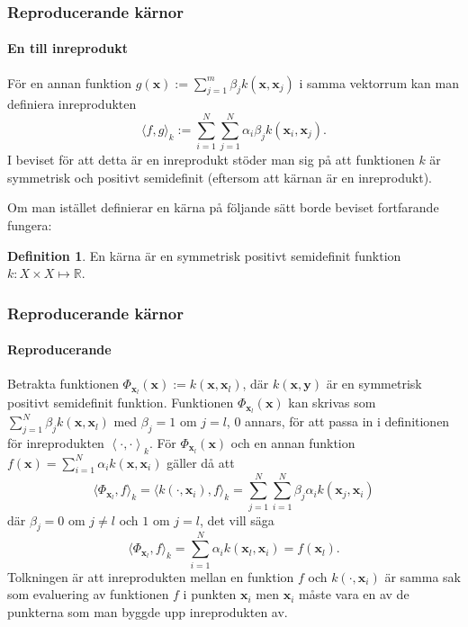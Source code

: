 \documentclass{beamer}
\theoremstyle{definition}
\newtheorem{defi}{Definition}[section]
\theoremstyle{remark}
\newcommand{\bfx}{\mathbf{x}}
\newcommand{\bfy}{\mathbf{y}}
\newcommand{\llangle}{\left\langle}
\newcommand{\rrangle}{\right\rangle}
\newcommand{\inner}[2]{\llangle #1, #2 \rrangle}
\begin{document}
\begin{frame}
\frametitle{Reproducerande kärnor}
\framesubtitle{En till inreprodukt}
För en annan funktion $g\left(\bfx\right):=\sum_{j=1}^{m}\beta_jk\left(\bfx, \bfx_j\right)$ i samma vektorrum kan man definiera inreprodukten
\begin{equation*}\label{eq:polykärnaprodukt}
\langle f , g\rangle_k := \sum_{i=1}^{N}\sum_{j=1}^{N} \alpha_i \beta_j k\left(\bfx_i, \bfx_j\right).
\end{equation*}
I beviset för att detta är en inreprodukt stöder man sig på att funktionen $k$ är symmetrisk och positivt semidefinit (eftersom att kärnan är en inreprodukt).

Om man istället definierar en kärna på följande sätt borde beviset fortfarande fungera:
\begin{defi}
	En kärna är en symmetrisk positivt semidefinit funktion $k: X \times X \longmapsto \mathbb{R}$.
\end{defi}
\end{frame}

\begin{frame}
\frametitle{Reproducerande kärnor}
\framesubtitle{Reproducerande}
Betrakta funktionen $\Phi_{\bfx_l}(\bfx):=k\left(\bfx, \bfx_l\right)$, där $k\left(\bfx, \bfy\right)$ är en symmetrisk positivt semidefinit funktion.  Funktionen $\Phi_{\bfx_l}\!(\bfx)$ kan skrivas som $\sum_{j=1}^{N}\!\beta_jk\left(\bfx, \bfx_l\right)$ med $\beta_j=1$ om $j=l$, 0 annars, för att passa in i definitionen för inreprodukten $\inner{\cdot}{\cdot}_k$. För $\Phi_{\bfx_l}(\bfx)$ och en annan funktion $f\left(\bfx\right) = \sum_{i=1}^{N}\alpha_ik\left(\bfx, \bfx_i\right)$ gäller då att
\begin{equation*}
\langle \Phi_{\bfx_l}, f\rangle_k = \langle k\left(\cdot, \bfx_i\right), f\rangle_k = \sum_{j=1}^{N}\sum_{i=1}^{N}\beta_j\alpha_i k\left(\bfx_j, \bfx_i\right)
\end{equation*}
där $\beta_j = 0$ om $j\neq l$ och $1$ om $j=l$, det vill säga
\begin{equation*}\label{eq:reproducing1}
\langle \Phi_{\bfx_l}, f\rangle_k = \sum_{i=1}^{N}\alpha_i k\left(\bfx_l, \bfx_i\right) = f\left(\bfx_l\right).
\end{equation*}
Tolkningen är att inreprodukten mellan en funktion $f$ och $k\left(\cdot, \bfx_i\right)$ är samma sak som evaluering av funktionen $f$ i punkten $\bfx_i$ men $\bfx_i$ måste vara en av de punkterna som man byggde upp inreprodukten av.

\end{frame}
\end{document}
